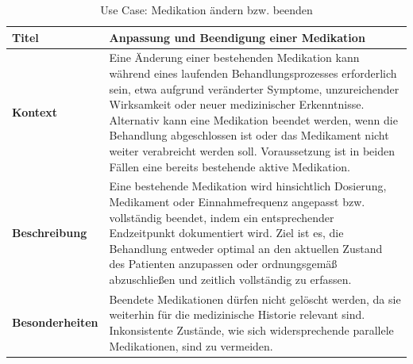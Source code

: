 \begin{table}[H]
\centering
\renewcommand{\arraystretch}{1.4}
\begin{tabularx}{\textwidth}{|p{4cm}|X|}
\hline
\textbf{Titel} & \textbf{Anpassung und Beendigung einer Medikation} \\
\hline
\textbf{Kontext} &
Eine Änderung einer bestehenden Medikation kann während eines laufenden Behandlungsprozesses erforderlich sein, etwa aufgrund veränderter Symptome, unzureichender Wirksamkeit oder neuer medizinischer Erkenntnisse. Alternativ kann eine Medikation beendet werden, wenn die Behandlung abgeschlossen ist oder das Medikament nicht weiter verabreicht werden soll. Voraussetzung ist in beiden Fällen eine bereits bestehende aktive Medikation. \\
\hline
\textbf{Beschreibung} &
Eine bestehende Medikation wird hinsichtlich Dosierung, Medikament oder Einnahmefrequenz angepasst bzw. vollständig beendet, indem ein entsprechender Endzeitpunkt dokumentiert wird. Ziel ist es, die Behandlung entweder optimal an den aktuellen Zustand des Patienten anzupassen oder ordnungsgemäß abzuschließen und zeitlich vollständig zu erfassen. \\
\hline
\textbf{Besonderheiten} &
Beendete Medikationen dürfen nicht gelöscht werden, da sie weiterhin für die medizinische Historie relevant sind. Inkonsistente Zustände, wie sich widersprechende parallele Medikationen, sind zu vermeiden. \\
\hline
\end{tabularx}
\caption{Use Case: Medikation ändern bzw. beenden}
\end{table}

